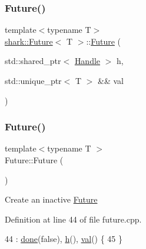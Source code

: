 \hypertarget{structshark_1_1_future_a2c240241a370e1775353f3c4f0f1b3bb}{}\label{structshark_1_1_future_a2c240241a370e1775353f3c4f0f1b3bb} 
\subsubsection{\texorpdfstring{Future()}{Future()}\hspace{0.1cm}{\footnotesize\ttfamily [2/5]}}
{\footnotesize\ttfamily template$<$typename T$>$ \\
\hyperlink{structshark_1_1_future}{shark\+::\+Future}$<$ T $>$\+::\hyperlink{structshark_1_1_future}{Future} (\begin{DoxyParamCaption}\item[{std\+::shared\+\_\+ptr$<$ \hyperlink{classshark_1_1_handle}{Handle} $>$}]{h,  }\item[{std\+::unique\+\_\+ptr$<$ T $>$ \&\&}]{val }\end{DoxyParamCaption})}

\hypertarget{structshark_1_1_future_adbc00059974d00508636b062c2062b9b}{}\label{structshark_1_1_future_adbc00059974d00508636b062c2062b9b} 
\subsubsection{\texorpdfstring{Future()}{Future()}\hspace{0.1cm}{\footnotesize\ttfamily [3/5]}}
{\footnotesize\ttfamily template$<$typename T $>$ \\
Future\+::\+Future (\begin{DoxyParamCaption}{ }\end{DoxyParamCaption})}

Create an inactive \hyperlink{structshark_1_1_future}{Future} 

Definition at line 44 of file future.\+cpp.


\begin{DoxyCode}
44                  : \hyperlink{structshark_1_1_future_ae873cf93e919c066f04ff337ce3a21e1}{done}(\textcolor{keyword}{false}), \hyperlink{structshark_1_1_future_a54f00db085adbffb18b2e2ab9e3d4b32}{h}(), \hyperlink{structshark_1_1_future_ad47e70b84ce6303568af0bd6aca991da}{val}() \{
45 \}
\end{DoxyCode}
\hypertarget{structshark_1_1_future_aa17ac6c907e9768b69c143d0b4046551}{}\label{structshark_1_1_future_aa17ac6c907e9768b69c143d0b4046551} 
